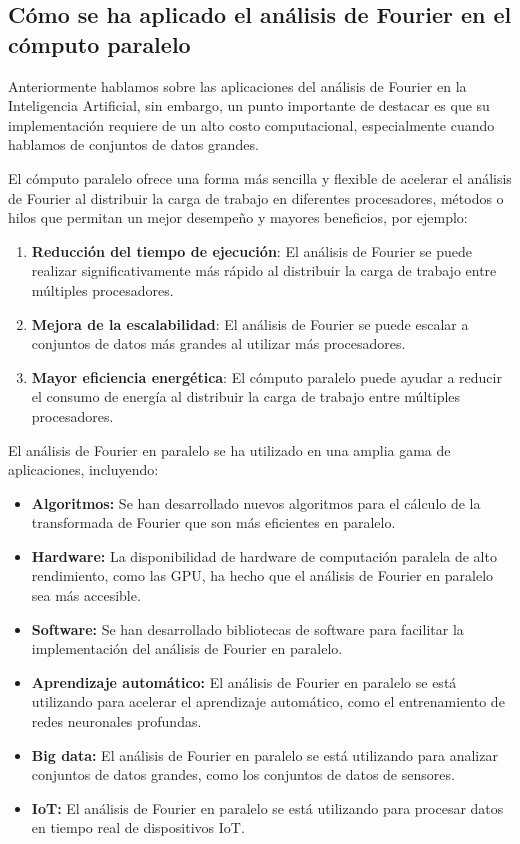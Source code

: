 \subsection{Cómo se ha aplicado el análisis de Fourier en el cómputo paralelo}

Anteriormente hablamos sobre las aplicaciones del análisis de Fourier en la Inteligencia Artificial, sin embargo, un punto importante de destacar es que su implementación requiere de un alto costo computacional, especialmente cuando hablamos de conjuntos de datos grandes.

El cómputo paralelo ofrece una forma más sencilla y flexible de acelerar el análisis de Fourier al distribuir la carga de trabajo en diferentes procesadores, métodos o hilos que permitan un mejor desempeño y mayores beneficios, por ejemplo:

\begin{enumerate} \def\labelenumi{\alph{enumi}.}
	\item \textbf{Reducción del tiempo de ejecución}: El análisis de Fourier se puede realizar significativamente más rápido al distribuir la carga de trabajo entre múltiples procesadores.
	\item \textbf{Mejora de la escalabilidad}: El análisis de Fourier se puede escalar a conjuntos de datos más grandes al utilizar más procesadores.
	\item \textbf{Mayor eficiencia energética}: El cómputo paralelo puede ayudar a reducir el consumo de energía al distribuir la carga de trabajo   entre múltiples procesadores.
\end{enumerate}

El análisis de Fourier en paralelo se ha utilizado en una amplia gama de aplicaciones, incluyendo:

\begin{itemize}
	\item \textbf{Algoritmos:} Se han desarrollado nuevos algoritmos para el   cálculo de la transformada de Fourier que son más eficientes en   paralelo.
	\item \textbf{Hardware:} La disponibilidad de hardware de computación   paralela de alto rendimiento, como las GPU, ha hecho que el análisis   de Fourier en paralelo sea más accesible.
	\item \textbf{Software:} Se han desarrollado bibliotecas de software para facilitar la implementación del análisis de Fourier en paralelo. \end{itemize}

\begin{itemize}
	\item \textbf{Aprendizaje automático:} El análisis de Fourier en paralelo se está utilizando para acelerar el aprendizaje automático, como el entrenamiento de redes neuronales profundas.
	\item \textbf{Big data:} El análisis de Fourier en paralelo se está utilizando para analizar conjuntos de datos grandes, como los   conjuntos de datos de sensores.
	\item \textbf{IoT:} El análisis de Fourier en paralelo se está utilizando para procesar datos en tiempo real de dispositivos IoT.
\end{itemize}

